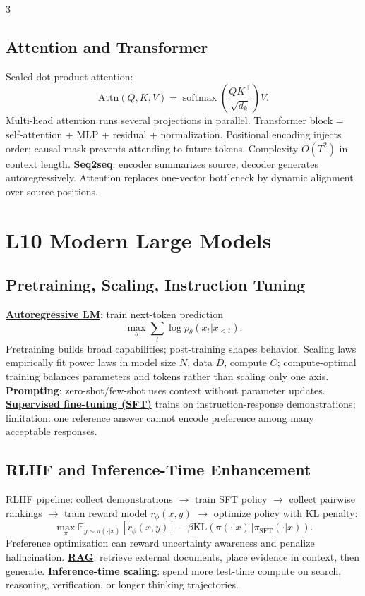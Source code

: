 \documentclass{article}
\newcommand{\key}[1]{\textbf{#1}}
\newcommand{\lowterm}[1]{\textbf{\underline{#1}}}
\newcommand{\E}{\mathbb{E}}
\newcommand{\KL}{\mathrm{KL}}
\DeclareMathOperator{\softmax}{softmax}
\begin{document}
\begin{multicols*}{3}
\subsection{Attention and Transformer}
Scaled dot-product attention:
\[
\mathrm{Attn}(Q,K,V)=\softmax\left(\frac{QK^\top}{\sqrt{d_k}}\right)V.
\]
Multi-head attention runs several projections in parallel. Transformer block = self-attention + MLP + residual + normalization. Positional encoding injects order; causal mask prevents attending to future tokens. Complexity $O(T^2)$ in context length.
\key{Seq2seq}: encoder summarizes source; decoder generates autoregressively. Attention replaces one-vector bottleneck by dynamic alignment over source positions.

\section{L10 Modern Large Models}
\subsection{Pretraining, Scaling, Instruction Tuning}
\lowterm{Autoregressive LM}: train next-token prediction
\[
\max_\theta\sum_t\log p_\theta(x_t|x_{<t}).
\]
Pretraining builds broad capabilities; post-training shapes behavior. Scaling laws empirically fit power laws in model size $N$, data $D$, compute $C$; compute-optimal training balances parameters and tokens rather than scaling only one axis.
\key{Prompting}: zero-shot/few-shot uses context without parameter updates. \lowterm{Supervised fine-tuning (SFT)} trains on instruction-response demonstrations; limitation: one reference answer cannot encode preference among many acceptable responses.

\subsection{RLHF and Inference-Time Enhancement}
RLHF pipeline: collect demonstrations $\to$ train SFT policy $\to$ collect pairwise rankings $\to$ train reward model $r_\phi(x,y)$ $\to$ optimize policy with KL penalty:
\[
\max_\pi \E_{y\sim\pi(\cdot|x)}[r_\phi(x,y)]-\beta\KL(\pi(\cdot|x)\Vert\pi_{\text{SFT}}(\cdot|x)).
\]
Preference optimization can reward uncertainty awareness and penalize hallucination. \lowterm{RAG}: retrieve external documents, place evidence in context, then generate. \lowterm{Inference-time scaling}: spend more test-time compute on search, reasoning, verification, or longer thinking trajectories.


\end{multicols*}
\end{document}
